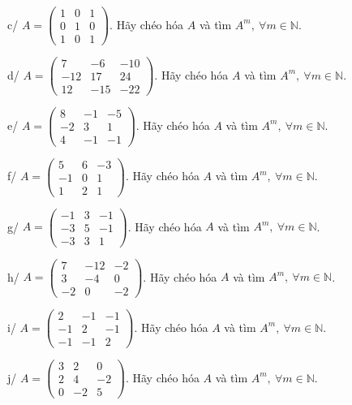 \documentclass[12pt,a4paper]{article}
\newcommand{\N}{\mathbb{N}}
\begin{document}
c/ $A=\begin{pmatrix}1 & 0 & 1\\ 0 & 1 & 0\\ 1 & 0 & 1\end{pmatrix}$. Hãy chéo hóa $A$ và tìm $A^m,\ \forall m\in\N$.

d/ $A=\begin{pmatrix}7 & -6 & -10\\ -12 & 17 & 24\\ 12 & -15 & -22\end{pmatrix}$. Hãy chéo hóa $A$ và tìm $A^m,\ \forall m\in\N$.

e/ $A=\begin{pmatrix}8 & -1 & -5\\ -2 & 3 & 1\\ 4 & -1 & -1\end{pmatrix}$. Hãy chéo hóa $A$ và tìm $A^m,\ \forall m\in\N$.

f/ $A=\begin{pmatrix}5 & 6 & -3\\ -1 & 0 & 1\\ 1 & 2 & 1\end{pmatrix}$. Hãy chéo hóa $A$ và tìm $A^m,\ \forall m\in\N$.

g/ $A=\begin{pmatrix}-1 & 3 & -1\\ -3 & 5 & -1\\ -3 & 3 & 1\end{pmatrix}$. Hãy chéo hóa $A$ và tìm $A^m,\ \forall m\in\N$.

h/ $A=\begin{pmatrix}7 & -12 & -2\\ 3 & -4 & 0\\ -2 & 0 & -2\end{pmatrix}$. Hãy chéo hóa $A$ và tìm $A^m,\ \forall m\in\N$.

i/ $A=\begin{pmatrix}2 & -1 & -1\\ -1 & 2 & -1\\ -1 & -1 & 2\end{pmatrix}$. Hãy chéo hóa $A$ và tìm $A^m,\ \forall m\in\N$.

j/ $A=\begin{pmatrix}3 & 2 & 0\\ 2 & 4 & -2\\ 0 & -2 & 5\end{pmatrix}$. Hãy chéo hóa $A$ và tìm $A^m,\ \forall m\in\N$.
\end{document}
